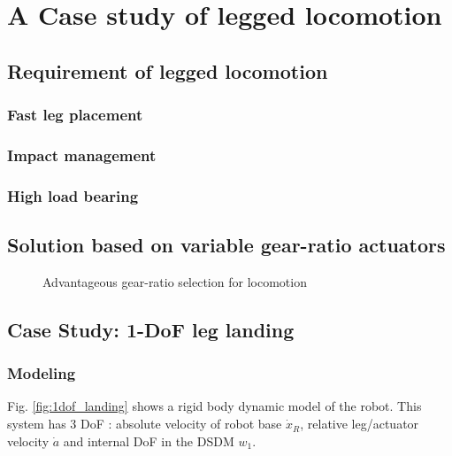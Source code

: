 \chapter{A Case study of legged locomotion}
\label{sec:casestudy}


\section{Requirement of legged locomotion}
\label{sec:case_req}

\subsection{Fast leg placement}
\label{sec:fast}

\subsection{Impact management}
\label{sec:impact}

\subsection{High load bearing}
\label{sec:load}


\section{Solution based on variable gear-ratio actuators}
\label{sec:case_sol}

\begin{figure}[H]
        \centering
        \caption{Advantageous gear-ratio selection for locomotion}\label{fig:legsol}
\end{figure}



\section{Case Study: 1-DoF leg landing}

\subsection{Modeling}

Fig. \ref{fig:1dof_landing} shows a rigid body dynamic model of the robot. This system has 3 DoF : absolute velocity of robot base $\dot{x}_R$, relative leg/actuator velocity $\dot{a}$ and internal DoF in the DSDM $w_1$. 

